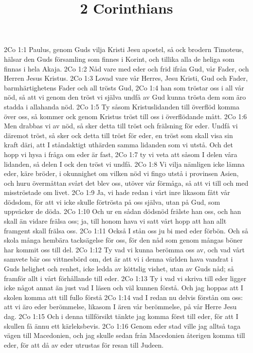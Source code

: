 

\title{2 Corinthians}

2Co 1:1  Paulus, genom Guds vilja Kristi Jesu apostel, så ock brodern Timoteus, hälsar den Guds församling som finnes i Korint, och tillika alla de heliga som finnas i hela Akaja.
2Co 1:2  Nåd vare med eder och frid ifrån Gud, vår Fader, och Herren Jesus Kristus.
2Co 1:3  Lovad vare vår Herres, Jesu Kristi, Gud och Fader, barmhärtighetens Fader och all trösts Gud,
2Co 1:4  han som tröstar oss i all vår nöd, så att vi genom den tröst vi själva undfå av Gud kunna trösta dem som äro stadda i allahanda nöd.
2Co 1:5  Ty såsom Kristuslidanden till överflöd komma över oss, så kommer ock genom Kristus tröst till oss i överflödande mått.
2Co 1:6  Men drabbas vi av nöd, så sker detta till tröst och frälsning för eder. Undfå vi däremot tröst, så sker ock detta till tröst för eder, en tröst som skall visa sin kraft däri, att I ståndaktigt uthärden samma lidanden som vi utstå. Och det hopp vi hysa i fråga om eder är fast,
2Co 1:7  ty vi veta att såsom I delen våra lidanden, så delen I ock den tröst vi undfå.
2Co 1:8  Vi vilja nämligen icke lämna eder, käre bröder, i okunnighet om vilken nöd vi fingo utstå i provinsen Asien, och huru övermåttan svårt det blev oss, utöver vår förmåga, så att vi till och med misströstade om livet.
2Co 1:9  Ja, vi hade redan i vårt inre likasom fått vår dödsdom, för att vi icke skulle förtrösta på oss själva, utan på Gud, som uppväcker de döda.
2Co 1:10  Och ur en sådan dödsnöd frälste han oss, och han skall än vidare frälsa oss; ja, till honom hava vi satt vårt hopp att han allt framgent skall frälsa oss.
2Co 1:11  Också I stån oss ju bi med eder förbön. Och så skola många hembära tacksägelse för oss, för den nåd som genom mångas böner har kommit oss till del.
2Co 1:12  Ty vad vi kunna berömma oss av, och vad vårt samvete bär oss vittnesbörd om, det är att vi i denna världen hava vandrat i Guds helighet och renhet, icke ledda av köttslig vishet, utan av Guds nåd; så framför allt i vårt förhållande till eder.
2Co 1:13  Ty i vad vi skriva till eder ligger icke något annat än just vad I läsen och väl kunnen förstå. Och jag hoppas att I skolen komma att till fullo förstå
2Co 1:14  vad I redan nu delvis förstån om oss: att vi äro eder berömmelse, likasom I ären vår berömmelse, på vår Herre Jesu dag.
2Co 1:15  Och i denna tillförsikt tänkte jag komma först till eder, för att I skullen få ännu ett kärleksbevis.
2Co 1:16  Genom eder stad ville jag alltså taga vägen till Macedonien, och jag skulle sedan från Macedonien återigen komma till eder, för att då av eder utrustas för resan till Judeen.

